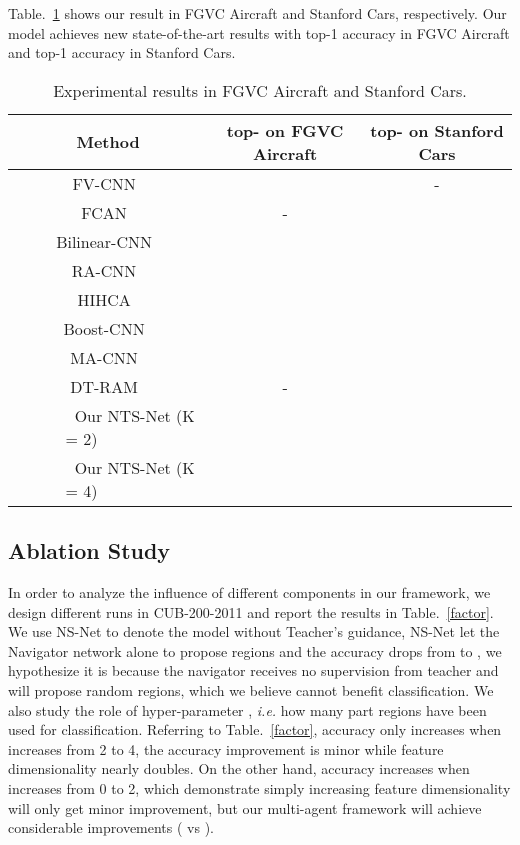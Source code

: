 \documentclass[runningheads]{llncs}
\begin{document}
Table.~\ref{aircraft_car} shows our result in FGVC Aircraft and Stanford Cars, respectively. Our model achieves new state-of-the-art results with  top-1 accuracy in FGVC Aircraft and  top-1 accuracy in Stanford Cars.

\begin{table}[ht]
	\begin{center}
	\begin{tabular}{|c|c|c|}
	\hline
	Method & top- on FGVC Aircraft & top- on Stanford Cars \\
	\hline\hline
	FV-CNN~\cite{Gosselin2014Revisiting} &  & - \\
	\hline
	FCAN~\cite{FCAN} & - &  \\
	\hline
	Bilinear-CNN~\cite{lin2015bilinear} &  &  \\
	\hline
	RA-CNN~\cite{Fu_2017_CVPR} &  & \\
	\hline
	HIHCA~\cite{Cai_2017_ICCV} &  & \\
	\hline
	Boost-CNN~\cite{Moghimi2016Boosted} &  & \\
	\hline
	MA-CNN~\cite{Zheng_2017_ICCV} &  & \\
	\hline
	DT-RAM~\cite{Li_2017_ICCV_Workshops} & - & \\
	\hline
	\hline
	~~~~~~ Our NTS-Net (K = 2) ~~~~~~ &  & \\
	\hline
	~~~~~~ Our NTS-Net (K = 4) ~~~~~~ &  & \\
	\hline
	\end{tabular}
	\end{center}
\caption{Experimental results in FGVC Aircraft and Stanford Cars.}
\label{aircraft_car}
\end{table}
\subsection{Ablation Study}
In order to analyze the influence of different components in our framework, we design different runs in CUB-200-2011 and report the results in Table.~\ref{factor}. We use NS-Net to denote the model without Teacher's guidance, NS-Net let the Navigator network alone to propose regions and the accuracy drops from  to , we hypothesize it is because the navigator receives no supervision from teacher and will propose random regions, which we believe cannot benefit classification. We also study the role of hyper-parameter , \emph{i.e.} how many part regions have been used for classification. Referring to Table.~\ref{factor}, accuracy only increases  when  increases from 2 to 4, the accuracy improvement is minor while feature dimensionality nearly doubles. On the other hand, accuracy increases  when  increases from 0 to 2, which demonstrate simply increasing feature dimensionality will only get minor improvement, but our multi-agent framework will achieve considerable improvements ( vs ). 
\end{document}
